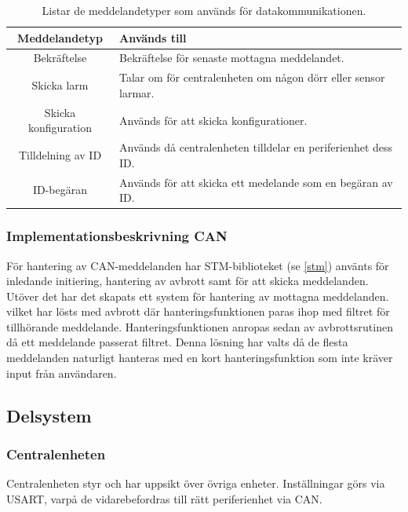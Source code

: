 \documentclass{article}
\begin{document}
\begin{table}[H]
	\centering
	\begin{tabular}{|c|p{}|}
		\hline
		Meddelandetyp & Används till \\ \hline \hline
		Bekräftelse		& Bekräftelse för senaste mottagna meddelandet. \\ \hline
		Skicka larm		& Talar om för centralenheten om någon dörr eller sensor larmar. \\ \hline
		Skicka konfiguration		& Används för att skicka konfigurationer. \\ \hline
		Tilldelning av ID		& Används då centralenheten tilldelar en periferienhet dess ID. \\ \hline
		ID-begäran		& Används för att skicka ett medelande som en begäran av ID. \\ \hline

	\end{tabular}
	\caption{Listar de meddelandetyper som används för datakommunikationen.}
	\label{tab:meddelandetyper}
\end{table}


\subsubsection{Implementationsbeskrivning CAN}
För hantering av CAN-meddelanden har STM-biblioteket (se \ref{stm}) använts för inledande initiering, hantering av avbrott samt för att skicka meddelanden.
Utöver det har det skapats ett system för hantering av mottagna meddelanden.
vilket har lösts med avbrott där hanteringsfunktionen paras ihop med filtret för tillhörande meddelande.
Hanteringsfunktionen anropas sedan av avbrottsrutinen då ett meddelande passerat filtret.
Denna lösning har valts då de flesta meddelanden naturligt hanteras med en kort hanteringsfunktion som inte kräver input från användaren.



\subsection{Delsystem }
\subsubsection{Centralenheten}
Centralenheten styr och har uppsikt över övriga enheter.
 Inställningar görs via USART, varpå de vidarebefordras till rätt periferienhet via CAN.
\end{document}
